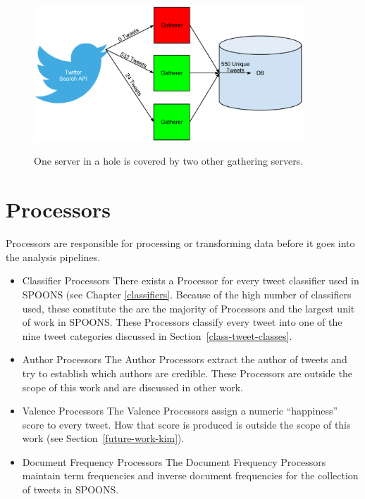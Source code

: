 \documentclass[12pt]{ucthesis}
\newcommand{\captionfonts}{\small\bf\ssp}
\begin{document}
\begin{figure}
   \begin{center}
      \includegraphics[width=0.9\textwidth]{images/Twitter_Holes.eps}
      \captionfonts
      \caption[Twitter Holes]{One server in a hole is covered by two other gathering servers.}
      \label{fig:ui}
   \end{center}
\end{figure}

\section{Processors}
\label{arch-processors}
Processors are responsible for processing or transforming data before it goes into the analysis pipelines.
\begin{itemize}
   \item{Classifier Processors} There exists a Processor for every tweet classifier used in SPOONS (see Chapter \ref{classifiers}.
   Because of the high number of classifiers used, these constitute the are the majority of Processors and the largest unit of work in SPOONS.
   These Processors classify every tweet into one of the nine tweet categories discussed in Section~\ref{class-tweet-classes}.

   \item{Author Processors} The Author Processors extract the author of tweets and try to establish which authors are credible. These Processors are
   outside the scope of this work and are discussed in other work\cite{cailinsThesis}.

   \item{Valence Processors} The Valence Processors assign a numeric ``happiness'' score to every tweet. How that score is produced is outside the
   scope of this work (see Section~\ref{future-work-kim}).

   \item{Document Frequency Processors} The Document Frequency Processors maintain term frequencies and inverse document frequencies for the collection
   of tweets in SPOONS.

\end{itemize}
\end{document}
